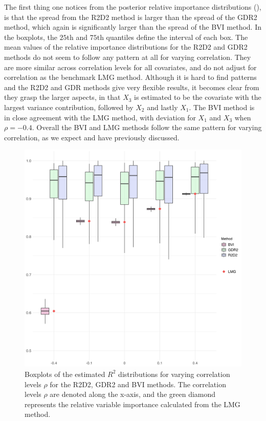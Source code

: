 \noindent The first thing one notices from the posterior relative importance distributions (), is that the spread from the R2D2 method is larger than the spread of the GDR2 method, which again is significantly larger than the spread of the BVI method. In the boxplots, the $25$th and $75$th quantiles define the interval of each box. The mean values of the relative importance distributions for the R2D2 and GDR2 methods do not seem to follow any pattern at all for varying correlation. They are more similar across correlation levels for all covariates, and do not adjust for correlation as the benchmark LMG method. Although it is hard to find patterns and the R2D2 and GDR methods give very flexible results, it becomes clear from they grasp the larger aspects, in that $X_3$ is estimated to be the covariate with the largest variance contribution, followed by $X_2$ and lastly $X_1$. The BVI method is in close agreement with the LMG method, with deviation for $X_1$ and $X_3$ when $\rho=-0.4$. Overall the BVI and LMG methods follow the same pattern for varying correlation, as we expect and have previously discussed.
\begin{figure}[H]%
  \centering
  \includegraphics[width=1\linewidth]{Figures/R2D2_BVI_Comparison/R2D2_BVI_R2_plot.png}
  \caption[Comparison of the marginal $R^2$ from the BVI method and the shrinkage prior methods]{Boxplots of the estimated $R^2$ distributions for varying correlation levels $\rho$ for the R2D2, GDR2 and BVI methods. The correlation levels $\rho$ are denoted along the x-axis, and the green diamond represents the relative variable importance calculated from the LMG method.}
  \label{fig:r2d2_r2}
\end{figure}
